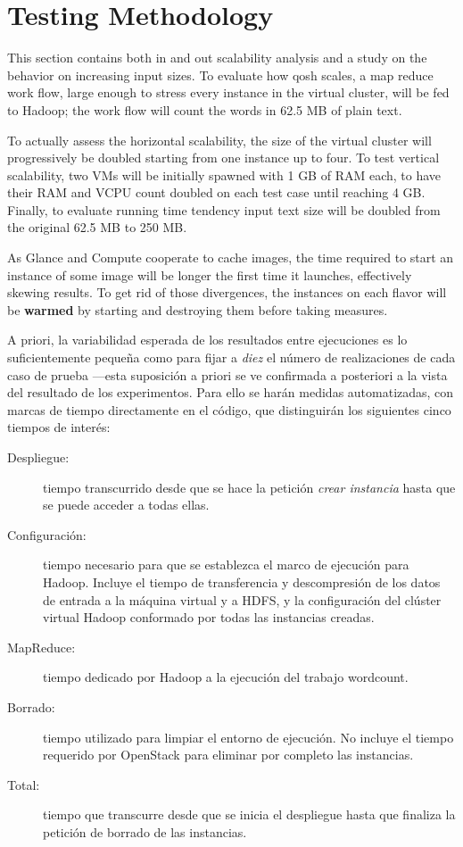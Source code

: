 \section{Testing Methodology}\label{sec:metodologiaprueba}
\noindent This section contains both in and out scalability analysis and a study on the behavior on increasing input sizes. To evaluate how qosh scales, a map reduce work flow, large enough to stress every instance in the virtual cluster, will be fed to Hadoop; the work flow will count the words in 62.5 MB of plain text.

To actually assess the horizontal scalability, the size of the virtual cluster will progressively be doubled starting from one instance up to four. To test vertical scalability, two VMs will be initially spawned with 1 GB of RAM each, to have their RAM and VCPU count doubled on each test case until reaching 4 GB. Finally, to evaluate running time tendency input text size will be doubled from the original 62.5 MB to 250 MB.

As Glance and Compute cooperate to cache images, the time required to start an instance of some image will be longer the first time it launches, effectively skewing results. To get rid of those divergences, the instances on each flavor will be \textbf{warmed} by starting and destroying them before taking measures.



A priori, la variabilidad esperada de los resultados entre ejecuciones es lo suficientemente peque\~na como para fijar a \emph{diez} el n\'umero de realizaciones de cada caso de prueba ---esta suposici\'on a priori se ve confirmada a posteriori a la vista del resultado de los experimentos. Para ello se har\'an medidas auto\-ma\-ti\-za\-das, con marcas de tiempo directamente en el c\'odigo, que distinguir\'an los siguientes cinco tiempos de inter\'es:

\begin{description}
    \item[Despliegue:] tiempo transcurrido desde que se hace la petici\'on \emph{crear ins\-tan\-cia} hasta que se puede acceder a todas ellas.
  \item[Configuraci\'on:] tiempo necesario para que se establezca el marco de ejecuci\'on para Hadoop. Incluye el tiempo de transferencia y descompresi\'on de los datos de entrada a la m\'aquina virtual y a HDFS, y la configuraci\'on del cl\'uster virtual Hadoop conformado por todas las instancias creadas.
  \item[MapReduce:] tiempo dedicado por Hadoop a la ejecuci\'on del trabajo wordcount.
  \item[Borrado:] tiempo utilizado para limpiar el entorno de ejecuci\'on. No incluye el tiempo requerido por OpenStack para eliminar por completo las ins\-tan\-cias.
  \item[Total:] tiempo que transcurre desde que se inicia el despliegue hasta que finaliza la petici\'on de borrado de las instancias.
\end{description}

